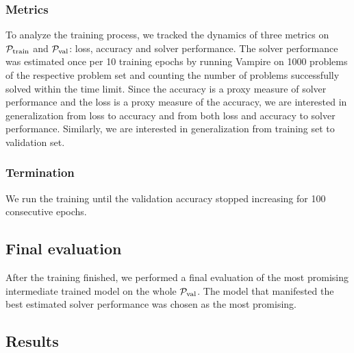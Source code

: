 \subsubsection{Metrics}
To analyze the training process,
we tracked the dynamics of three metrics on $\operatorname{\mathcal{P}_{\mathrm{train}}}$ and $\operatorname{\mathcal{P}_{\mathrm{val}}}$:
loss, accuracy and solver performance.
The solver performance was estimated once per 10 training epochs by running Vampire
on \num{1000} problems of the respective problem set
and counting the number of problems successfully solved within the time limit.
Since the accuracy is a proxy measure of solver performance and the loss is a proxy measure of the accuracy,
we are interested in generalization from loss to accuracy and from both loss and accuracy to solver performance.
Similarly, we are interested in generalization from training set to validation set.

\subsubsection{Termination}
We run the training until the validation accuracy stopped increasing for 100 consecutive epochs.

\subsection{Final evaluation}

After the training finished,
we performed a final evaluation of the most promising intermediate trained model on the whole $\operatorname{\mathcal{P}_{\mathrm{val}}}$.
The model that manifested the best estimated solver performance was chosen as the most promising.

\subsection{Results}


